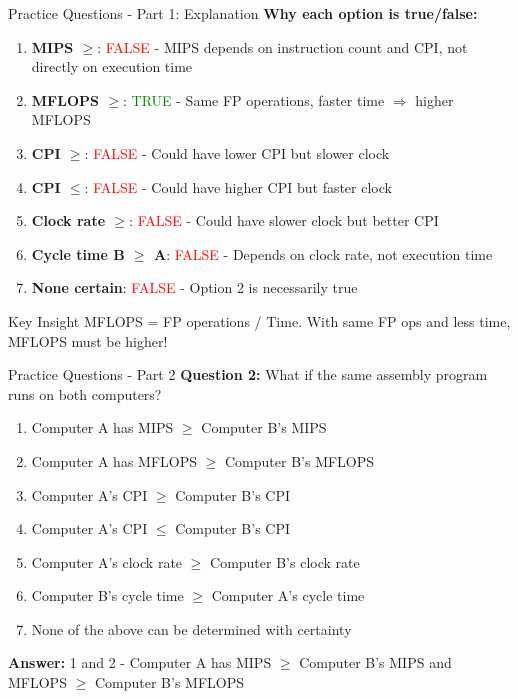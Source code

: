 \documentclass[aspectratio=169,12pt]{beamer}
\begin{document}
\begin{frame}{Practice Questions - Part 1: Explanation}
\textbf{Why each option is true/false:}

\begin{enumerate}
    \item \textbf{MIPS $\geq$}: \textcolor{red}{FALSE} - MIPS depends on instruction count and CPI, not directly on execution time
    \item \textbf{MFLOPS $\geq$}: \textcolor{green}{TRUE} - Same FP operations, faster time $\Rightarrow$ higher MFLOPS
    \item \textbf{CPI $\geq$}: \textcolor{red}{FALSE} - Could have lower CPI but slower clock
    \item \textbf{CPI $\leq$}: \textcolor{red}{FALSE} - Could have higher CPI but faster clock
    \item \textbf{Clock rate $\geq$}: \textcolor{red}{FALSE} - Could have slower clock but better CPI
    \item \textbf{Cycle time B $\geq$ A}: \textcolor{red}{FALSE} - Depends on clock rate, not execution time
    \item \textbf{None certain}: \textcolor{red}{FALSE} - Option 2 is necessarily true
\end{enumerate}

\begin{block}{Key Insight}
MFLOPS = FP operations / Time. With same FP ops and less time, MFLOPS must be higher!
\end{block}
\end{frame}

\begin{frame}{Practice Questions - Part 2}
\textbf{Question 2:} What if the same assembly program runs on both computers?

\begin{enumerate}
    \item Computer A has MIPS $\geq$ Computer B's MIPS
    \item Computer A has MFLOPS $\geq$ Computer B's MFLOPS
    \item Computer A's CPI $\geq$ Computer B's CPI
    \item Computer A's CPI $\leq$ Computer B's CPI
    \item Computer A's clock rate $\geq$ Computer B's clock rate
    \item Computer B's cycle time $\geq$ Computer A's cycle time
    \item None of the above can be determined with certainty
\end{enumerate}

\pause
\textbf{Answer:} 1 and 2 - Computer A has MIPS $\geq$ Computer B's MIPS and MFLOPS $\geq$ Computer B's MFLOPS
\end{frame}
\end{document}
